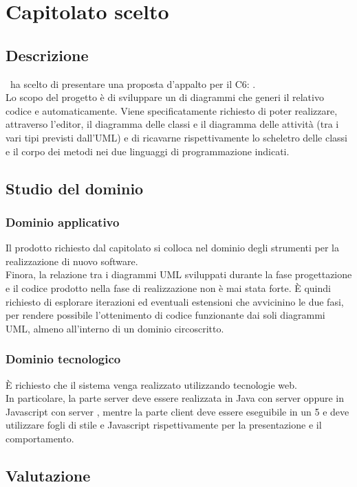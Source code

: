 \documentclass[../StudioDiFattibilita.tex]{subfiles}
\begin{document}
	\section{Capitolato scelto}
		\subsection{Descrizione}
			\kaleidoscode\ ha scelto di presentare una proposta d'appalto per il  C6: \progetto.\\
			Lo scopo del progetto è di sviluppare un  di diagrammi  che generi il relativo codice  e
			 automaticamente.
			Viene specificatamente richiesto di poter realizzare, attraverso l'editor, il diagramma delle classi
			e il diagramma delle attività (tra i vari tipi previsti dall'UML) e di ricavarne rispettivamente lo
			scheletro delle classi e il corpo dei metodi nei due linguaggi di programmazione indicati.
		\subsection{Studio del dominio}
			\subsubsection{Dominio applicativo}
				Il prodotto richiesto dal capitolato si colloca nel dominio degli strumenti per la realizzazione
				di nuovo software.\\
				Finora, la relazione tra i diagrammi UML sviluppati durante la fase progettazione e il codice
				prodotto nella fase di realizzazione non è mai stata forte.
				È quindi richiesto di esplorare iterazioni ed eventuali estensioni che avvicinino le due fasi,
				per rendere possibile l'ottenimento di codice funzionante dai soli diagrammi UML, almeno
				all'interno di un dominio circoscritto.
			\subsubsection{Dominio tecnologico}
				È richiesto che il sistema venga realizzato utilizzando tecnologie web.\\
				In particolare, la parte server deve essere realizzata in Java con server  oppure in
				Javascript con server , mentre la parte client deve essere eseguibile in un 
				5 e deve utilizzare fogli di stile  e Javascript rispettivamente per la presentazione e il comportamento.
		\subsection{Valutazione}
\end{document}
